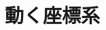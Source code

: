 \documentclass[../../all/physics-standard_answers_all.tex]{subfiles}
\begin{document}
\section{動く座標系}
\end{document}
